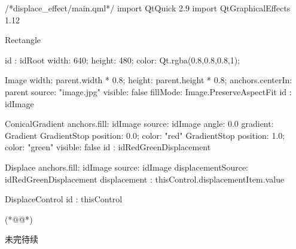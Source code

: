\label{f000063}    %
\FloatBarrier                                  %
\begin{thebookfilesourceone}[escapeinside={(*@}{@*)},
caption=GoodLuck,
title=\filesourcenumbernameone \thefilesourcenumber
]
/*displace_effect/main.qml*/
import QtQuick 2.9
import QtGraphicalEffects 1.12

Rectangle {
    id : idRoot
    width: 640;
    height: 480;
    color: Qt.rgba(0.8,0.8,0.8,1);

    Image{
        width: parent.width * 0.8;
        height: parent.height * 0.8;
        anchors.centerIn: parent
        source: "image.jpg"
        visible: false
        fillMode: Image.PreserveAspectFit
        id : idImage
    }

    ConicalGradient {
        anchors.fill: idImage
        source: idImage
        angle: 0.0
        gradient: Gradient {
            GradientStop { position: 0.0; color: "red" }
            GradientStop { position: 1.0; color: "green" }
        }
        visible: false
        id : idRedGreenDisplacement
    }

    Displace{
        anchors.fill: idImage
        source: idImage
        displacementSource: idRedGreenDisplacement
        displacement : thisControl.displacementItem.value
    }

    DisplaceControl{
        id : thisControl
    }

}(*@\marginpar[\hfill\setlength\fboxsep{2pt}\fbox{\footnotesize{\kaishu\parbox{1em}{\setlength{\baselineskip}{2pt}\filesourcenumbernameone}}\footnotesize{\thefilesourcenumber}}]{\setlength\fboxsep{2pt}\fbox{\footnotesize{\kaishu\parbox{1em}{\setlength{\baselineskip}{2pt}\filesourcenumbernameone}}\footnotesize{\thefilesourcenumber}}}@*)\end{thebookfilesourceone}          %
\addtocounter{lstlisting}{-1}   %


未完待续









